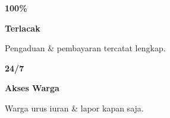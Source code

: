 \documentclass[a4paper]{article}
\begin{document}
\begin{minipage}[t]{0.485\textwidth}
    \noindent\colorbox{BlueBg}{%
        \begin{minipage}[t][2.7cm][c]{\dimexpr\linewidth-2\fboxsep\relax}
            \centering
            {\fontsize{20}{24}\selectfont\bfseries\color{BluePrimary} 100\%}\par\vspace{2pt}
            {\fontsize{9.5}{12}\selectfont\bfseries\color{BlueDark} Terlacak}\par\vspace{2pt}
            {\fontsize{8.5}{11}\selectfont\color{TextDark}Pengaduan \& pembayaran tercatat lengkap.}
        \end{minipage}}\par
    \vspace{6pt}
    \noindent\colorbox{BlueBg}{%
        \begin{minipage}[t][2.7cm][c]{\dimexpr\linewidth-2\fboxsep\relax}
            \centering
            {\fontsize{20}{24}\selectfont\bfseries\color{BluePrimary} 24/7}\par\vspace{2pt}
            {\fontsize{9.5}{12}\selectfont\bfseries\color{BlueDark} Akses Warga}\par\vspace{2pt}
            {\fontsize{8.5}{11}\selectfont\color{TextDark}Warga urus iuran \& lapor kapan saja.}
        \end{minipage}}%
\end{minipage}

\vspace{8pt}
\end{document}
